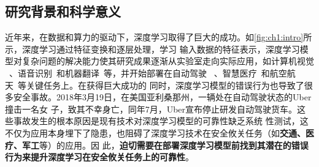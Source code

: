 
\subsection{研究背景和科学意义}



%
近年来，在数据和算力的驱动下，深度学习取得了巨大的成功。如\cref{fig:ch1:intro}所示，深度学习通过特征变换和逐层处理，学习
输入数据的特征表示，深度学习模型对复杂问题的解决能力使其研究成果逐渐从实验室走向实际应用，如计算机视觉
~\cite{dai2021up}、语音识别~\cite{baevski2021unsupervised}和机器翻译~\cite{fan2021beyond}等，并开始部署在自动驾驶
~\cite{feng2021review}、智慧医疗~\cite{liang2021accurate}和航空航天~\cite{julian2019deep}等关键任务上。在获得巨大成功的
同时，深度学习模型的错误行为也导致了很多安全事故。2018年3月19日，在美国亚利桑那州，一辆处在自动驾驶状态的Uber撞击一名女
子，致其不幸身亡，同年7月，Uber宣布停止研发自动驾驶货车。这些事故发生的根本原因是现有技术对深度学习模型的可靠性缺乏系统
性测试，这不仅为应用本身埋下了隐患，也阻碍了深度学习技术在安全攸关任务（如\textbf{交通、医疗、军工}等）的应用。因
此，\textbf{迫切需要在部署深度学习模型前找到其潜在的错误行为来提升深度学习在安全攸关任务上的可靠性}。

